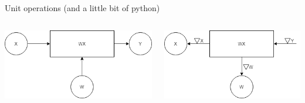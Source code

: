 \begin{frame}{Unit operations (and a little bit of python)}
\begin{columns}
	\begin{column}{.4\textwidth}
		\includegraphics[width=.9\textwidth, center]{figuras/wx_forward_pass.png}
	\end{column}
	\begin{column}{.4\textwidth}
		\includegraphics[width=.9\textwidth, center]{figuras/wx_backward_pass.png}
	\end{column}
\end{columns}
	
	
\end{frame}

